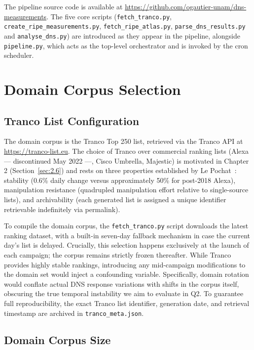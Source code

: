 The pipeline source code is available at \url{https://github.com/ogautier-unam/dns-measurements}. The five core scripts (\texttt{fetch\_tranco.py}, \texttt{create\_ripe\_measurements.py}, \texttt{fetch\_ripe\_atlas.py}, \texttt{parse\_dns\_results.py} and \texttt{analyse\_dns.py}) are introduced as they appear in the pipeline, alongside \texttt{pipeline.py}, which acts as the top-level orchestrator and is invoked by the cron scheduler.

\section{Domain Corpus Selection}
\label{sec:3.2}

\subsection{Tranco List Configuration}
\label{subsec:3.2.1}

The domain corpus is the Tranco Top 250 list, retrieved via the Tranco API at \url{https://tranco-list.eu}. The choice of Tranco over commercial ranking lists (Alexa — discontinued May 2022 —, Cisco Umbrella, Majestic) is motivated in Chapter 2 (Section~\ref{sec:2.6}) and rests on three properties established by Le Pochat~\cite{LePochat2019}: stability (0.6\% daily change versus approximately 50\% for post-2018 Alexa), manipulation resistance (quadrupled manipulation effort relative to single-source lists), and archivability (each generated list is assigned a unique identifier retrievable indefinitely via permalink).

To compile the domain corpus, the \texttt{fetch\_tranco.py} script downloads the latest ranking dataset, with a built-in seven-day fallback mechanism in case the current day's list is delayed. Crucially, this selection happens exclusively at the launch of each campaign; the corpus remains strictly frozen thereafter. While Tranco provides highly stable rankings, introducing any mid-campaign modifications to the domain set would inject a confounding variable. Specifically, domain rotation would conflate actual \ac{DNS} response variations with shifts in the corpus itself, obscuring the true temporal instability we aim to evaluate in Q2. To guarantee full reproducibility, the exact Tranco list identifier, generation date, and retrieval timestamp are archived in \texttt{tranco\_meta.json}.

\subsection{Domain Corpus Size}
\label{subsec:3.2.2}

